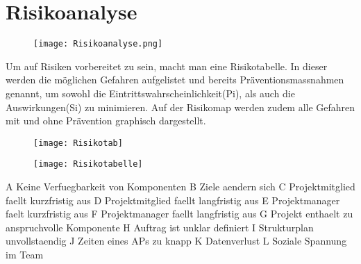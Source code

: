 \section{Risikoanalyse}
\begin{figure}[H]
	\centering
	\texttt{[image: Risikoanalyse.png]}
	\label{fig:Risikoanalyse}
\end{figure}

\newpage
Um auf Risiken vorbereitet zu sein, macht man eine Risikotabelle. In dieser werden die möglichen Gefahren aufgelistet und bereits Präventionsmassnahmen genannt, um sowohl die Eintrittswahrscheinlichkeit(Pi), als auch die Auswirkungen(Si) zu minimieren. Auf der Risikomap werden zudem alle Gefahren mit und ohne Prävention graphisch dargestellt.

\begin{figure}[H]
	\centering
	\texttt{[image: Risikotab]}
	\label{fig:Risikodiagramm}
\end{figure}

\begin{figure}[H]
	\centering
	\texttt{[image: Risikotabelle]}
	\label{fig:Tabelle}
\end{figure}
A 	Keine Verfuegbarkeit von Komponenten \newline 
B 	Ziele aendern sich\newline 
C 	Projektmitglied faellt kurzfristig aus\newline 
D	Projektmitglied faellt langfristig aus\newline 
E 	Projektmanager faelt kurzfristig aus\newline 
F 	Projektmanager faellt langfristig aus\newline 
G	Projekt enthaelt zu anspruchvolle Komponente\newline 
H	Auftrag ist unklar definiert\newline 
I	Strukturplan unvollstaendig\newline 
J	Zeiten eines APs zu knapp\newline 
K	Datenverlust\newline 
L	Soziale Spannung im Team\newline 

